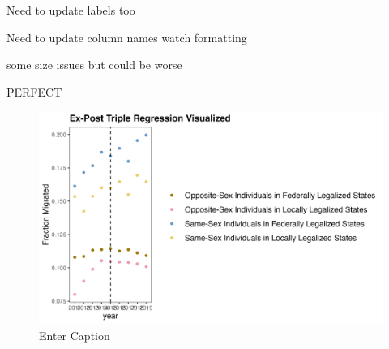 \documentclass[]{article}
\begin{document}
\begin{landscape}
\begin{center}

\end{center}
\end{landscape}
Need to update labels too

\clearpage


Need to update column names
watch formatting

\clearpage

\begin{landscape}
\begin{center}

\end{center}
\end{landscape}
some size issues but could be worse

\clearpage

\begin{landscape}
\begin{center}

\end{center}
\end{landscape}
PERFECT

\clearpage

\begin{figure}
    \centering
    \includegraphics[width=1\linewidth]{outputs/summary_stats/post_trends.png}
    \caption{Enter Caption}
    \label{fig:enter-label}
\end{figure}
\end{document}
